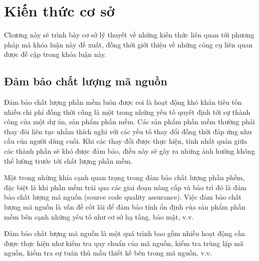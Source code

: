 \documentclass[12pt]{report}
\begin{document}
\chapter{Kiến thức cơ sở}
\label{chap:background}
Chương này sẽ trình bày cơ sở lý thuyết về những kiến thức liên quan tới phương pháp mà khóa luận này đề xuất, đồng thời giới thiệu về những công cụ liên quan được đề cập trong khóa luận này.
\section{Đảm bảo chất lượng mã nguồn}
Đảm bảo chất lượng phần mềm luôn được coi là hoạt động khó khăn tiêu tốn nhiều chi phí đồng thời cũng là một trong những yếu tố quyết định tới sự thành công của một dự án, sản phẩm phần mềm. Các sản phẩm phần mềm thường phải thay đôi liên tục nhằm thích nghi với các yếu tố thay đổi đồng thời đáp ứng nhu cầu của người dùng cuối. Khi các thay đổi được thực hiện, tính nhất quán giữa các thành phần sẽ khó được đảm bảo, điều này sẽ gây ra những ảnh hưởng không thể lường trước tới chất lượng phần mềm.

\noindent Một trong những khía cạnh quan trọng trong đảm bảo chất lượng phần phềm, đặc biệt là khi phần mềm trải qua các giai đoạn nâng cấp và bảo trì đó là đảm bảo chất lượng mã nguồn (source code quality assurance). Việc đảm bảo chất lượng mã nguồn là vấn đề cốt lõi để đảm bảo tính ổn định của sản phẩm phần mềm bên cạnh những yêu tố như cơ sở hạ tầng, bảo mật, v.v.

\noindent Đảm bảo chất lượng mã nguồn là một quá trình bao gồm nhiều hoạt động cần được thực hiện như kiểm tra quy chuẩn của mã nguồn, kiểm tra trùng lặp mã nguồn, kiểm tra sự tuân thủ mẫu thiết kế bên trong mã nguồn, v.v.
\end{document}
